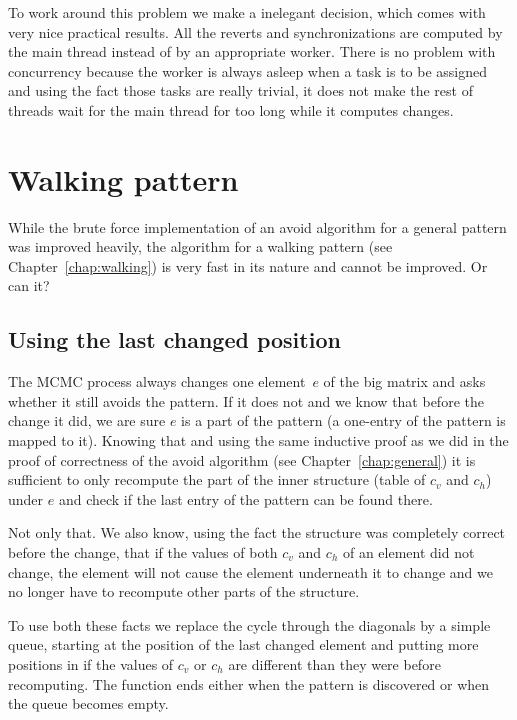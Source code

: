 To work around this problem we make a inelegant decision, which comes with very nice practical results. All the reverts and synchronizations are computed by the main thread instead of by an appropriate worker. There is no problem with concurrency because the worker is always asleep when a task is to be assigned and using the fact those tasks are really trivial, it does not make the rest of threads wait for the main thread for too long while it computes changes.

\section{Walking pattern}
While the brute force implementation of an avoid algorithm for a general pattern was improved heavily, the algorithm for a walking pattern (see Chapter~\ref{chap:walking}) is very fast in its nature and cannot be improved. Or can it?

\subsection{Using the last changed position}
The MCMC process always changes one element~$e$ of the big matrix and asks whether it still avoids the pattern. If it does not and we know that before the change it did, we are sure $e$ is a part of the pattern (a one-entry of the pattern is mapped to it). Knowing that and using the same inductive proof as we did in the proof of correctness of the avoid algorithm (see Chapter~\ref{chap:general}) it is sufficient to only recompute the part of the inner structure (table of $c_v$ and $c_h$) under $e$ and check if the last entry of the pattern can be found there.

Not only that. We also know, using the fact the structure was completely correct before the change, that if the values of both $c_v$ and $c_h$ of an element did not change, the element will not cause the element underneath it to change and we no longer have to recompute other parts of the structure.

To use both these facts we replace the cycle through the diagonals by a simple queue, starting at the position of the last changed element and putting more positions in if the values of $c_v$ or $c_h$ are different than they were before recomputing. The function ends either when the pattern is discovered or when the queue becomes empty.

